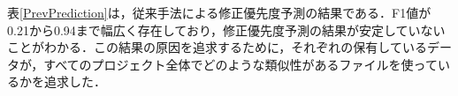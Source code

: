 \documentclass[T,J]{fose} %
\begin{document}

表\ref{PrevPrediction}は，従来手法による修正優先度予測の結果である．F1値が0.21から0.94まで幅広く存在しており，修正優先度予測の結果が安定していないことがわかる．この結果の原因を追求するために，それぞれの保有しているデータが，すべてのプロジェクト全体でどのような類似性があるファイルを使っているかを追求した．
\end{document}
